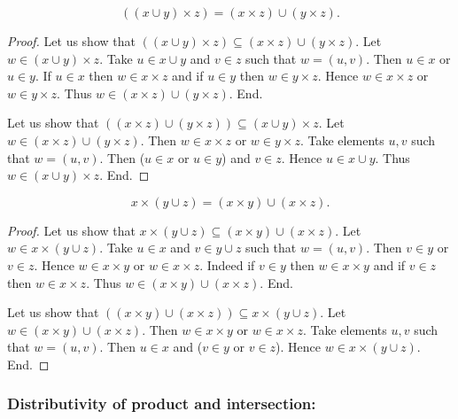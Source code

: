 \documentclass[../../set-theory.ftl.tex]{subfiles}
\begin{document}
  \begin{forthel}
    \begin{proposition}\label{SetTheory_01_06_138531}
      \[ ((x \cup y) \times z) = (x \times z) \cup (y \times z). \]
    \end{proposition}
    \begin{proof}
      Let us show that $((x \cup y) \times z) \subseteq (x \times z) \cup (y \times z).$
        Let $w \in (x \cup y) \times z$.
        Take $u \in x \cup y$ and $v \in z$ such that $w = (u,v)$.
        Then $u \in x$ or $u \in y$.
        If $u \in x$ then $w \in x \times z$ and if $u \in y$ then $w \in y \times z$.
        Hence $w \in x \times z$ or $w \in y \times z$.
        Thus $w \in (x \times z) \cup (y \times z)$.
      End.

      Let us show that $((x \times z) \cup (y \times z)) \subseteq (x \cup y) \times z$.
        Let $w \in (x \times z) \cup (y \times z)$.
        Then $w \in x \times z$ or $w \in y \times z$.
        Take elements $u,v$ such that $w = (u,v)$.
        Then ($u \in x$ or $u \in y$) and $v \in z$.
        Hence $u \in x \cup y$.
        Thus $w \in (x \cup y) \times z$.
      End.
    \end{proof}

    \begin{proposition}\label{SetTheory_01_06_575129}
      \[ x \times (y \cup z) = (x \times y) \cup (x \times z). \]
    \end{proposition}
    \begin{proof}
      Let us show that $x \times (y \cup z) \subseteq (x \times y) \cup (x \times z)$.
        Let $w \in x \times (y \cup z)$.
        Take $u \in x$ and $v \in y \cup z$ such that $w = (u,v)$.
        Then $v \in y$ or $v \in z$.
        Hence $w \in x \times y$ or $w \in x \times z$.
        Indeed if $v \in y$ then $w \in x \times y$ and if $v \in z$ then $w \in x \times z$.
        Thus $w \in (x \times y) \cup (x \times z)$.
      End.

      Let us show that $((x \times y) \cup (x \times z)) \subseteq x \times (y \cup z)$.
        Let $w \in (x \times y) \cup (x \times z)$.
        Then $w \in x \times y$ or $w \in x \times z$.
        Take elements $u,v$ such that $w = (u,v)$.
        Then $u \in x$ and ($v \in y$ or $v \in z$).
        Hence $w \in x \times (y \cup z)$.
      End.
    \end{proof}
  \end{forthel}


  \subsubsection*{Distributivity of product and intersection:}
\end{document}
